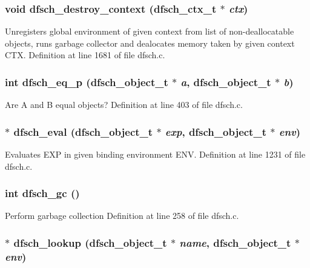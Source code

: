 \subsubsection{\setlength{\rightskip}{0pt plus 5cm}void dfsch\_\-destroy\_\-context ({\bf dfsch\_\-ctx\_\-t} $\ast$ {\em ctx})}\label{dfsch_8h_a48}


Unregisters global environment of given context from list of non-deallocatable objects, runs garbage collector and dealocates memory taken by given context CTX. Definition at line 1681 of file dfsch.c.
\subsubsection{\setlength{\rightskip}{0pt plus 5cm}int dfsch\_\-eq\_\-p ({\bf dfsch\_\-object\_\-t} $\ast$ {\em a}, {\bf dfsch\_\-object\_\-t} $\ast$ {\em b})}\label{dfsch_8h_a9}


Are A and B equal objects? Definition at line 403 of file dfsch.c.
\subsubsection{$\ast$ dfsch\_\-eval ({\bf dfsch\_\-object\_\-t} $\ast$ {\em exp}, {\bf dfsch\_\-object\_\-t} $\ast$ {\em env})}\label{dfsch_8h_a44}


Evaluates EXP in given binding environment ENV. Definition at line 1231 of file dfsch.c.
\subsubsection{\setlength{\rightskip}{0pt plus 5cm}int dfsch\_\-gc ()}\label{dfsch_8h_a6}


Perform garbage collection Definition at line 258 of file dfsch.c.
\subsubsection{$\ast$ dfsch\_\-lookup ({\bf dfsch\_\-object\_\-t} $\ast$ {\em name}, {\bf dfsch\_\-object\_\-t} $\ast$ {\em env})}\label{dfsch_8h_a41}


